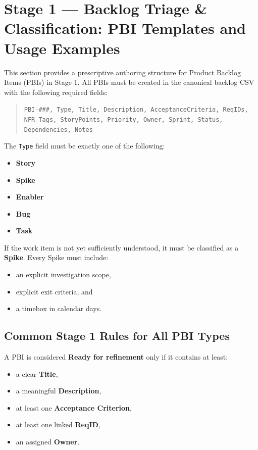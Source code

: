 \documentclass[11pt,a4paper]{article}
\begin{document}
\section{Stage 1 --- Backlog Triage \& Classification: PBI Templates and Usage Examples}

This section provides a prescriptive authoring structure for Product Backlog Items (PBIs) in Stage 1.  
All PBIs must be created in the canonical backlog CSV with the following required fields:

\begin{quote}
\texttt{PBI-\#\#\#, Type, Title, Description, AcceptanceCriteria, ReqIDs, NFR\_Tags, StoryPoints, Priority, Owner, Sprint, Status, Dependencies, Notes}
\end{quote}

The \texttt{Type} field must be exactly one of the following:

\begin{itemize}[leftmargin=1.5em]
    \item \textbf{Story}
    \item \textbf{Spike}
    \item \textbf{Enabler}
    \item \textbf{Bug}
    \item \textbf{Task}
\end{itemize}

If the work item is not yet sufficiently understood, it must be classified as a \textbf{Spike}.  
Every Spike must include:
\begin{itemize}[leftmargin=1.5em]
    \item an explicit investigation scope,
    \item explicit exit criteria, and
    \item a timebox in calendar days.
\end{itemize}

\subsection{Common Stage 1 Rules for All PBI Types}

A PBI is considered \textbf{Ready for refinement} only if it contains at least:

\begin{itemize}[leftmargin=1.5em]
    \item a clear \textbf{Title},
    \item a meaningful \textbf{Description},
    \item at least one \textbf{Acceptance Criterion},
    \item at least one linked \textbf{ReqID},
    \item an assigned \textbf{Owner}.
\end{itemize}
\end{document}
